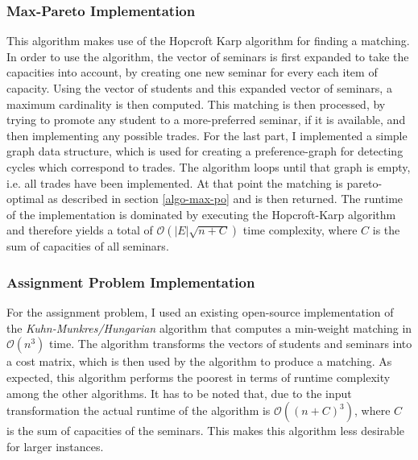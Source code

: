 \subsubsection{Max-Pareto Implementation}\label{impl:maxpo}
This algorithm makes use of the Hopcroft Karp algorithm for finding a matching. In order to use the algorithm, the vector of seminars is first expanded to take the capacities into account, by creating one new seminar for every each item of capacity. Using the vector of students and this expanded vector of seminars, a maximum cardinality is then computed. This matching is then processed, by trying to promote any student to a more-preferred seminar, if it is available, and then implementing any possible trades. For the last part, I implemented a simple graph data structure, which is used for creating a preference-graph for detecting cycles which correspond to trades. The algorithm loops until that graph is empty, i.e. all trades have been implemented. At that point the matching is pareto-optimal as described in section \ref{algo-max-po} and is then returned. The runtime of the implementation is dominated by executing the Hopcroft-Karp algorithm and therefore yields a total of $\mathcal{O}(|E|\sqrt{n+C})$ time complexity, where $C$ is the sum of capacities of all seminars.

\subsubsection{Assignment Problem Implementation}
For the assignment problem, I used an existing open-source implementation of the \emph{Kuhn-Munkres/Hungarian} algorithm that computes a min-weight matching in $\mathcal{O}(n^3)$ time\cite{HungarianGithub}. The algorithm transforms the vectors of students and seminars into a cost matrix, which is then used by the algorithm to produce a matching. As expected, this algorithm performs the poorest in terms of runtime complexity among the other algorithms. It has to be noted that, due to the input transformation the actual runtime of the algorithm is $\mathcal{O}((n + C)^3)$, where $C$ is the sum of capacities of the seminars. This makes this algorithm less desirable for larger instances.

